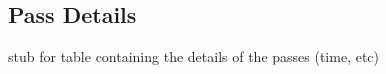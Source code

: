 
\begin{appendices}
\chapter{Pass Details}\label{app:pass_details}
\par stub for table containing the details of the passes (time, etc)
\end{appendices}